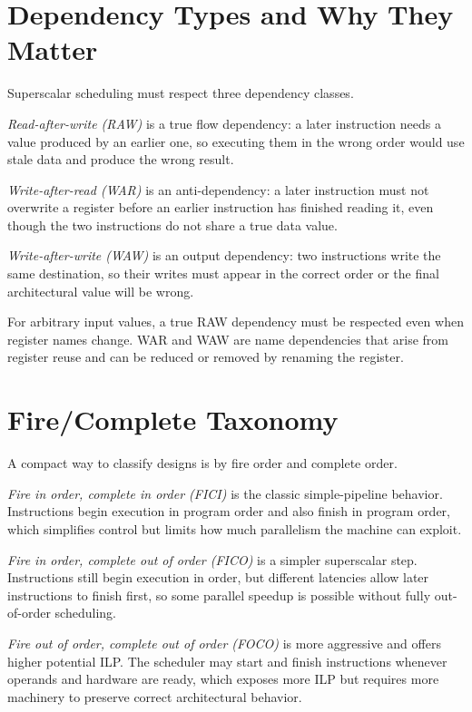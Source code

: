 \section{Dependency Types and Why They Matter}\label{sec:ilp-dependencies}
Superscalar scheduling must respect three dependency classes.

\textit{Read-after-write (RAW)} is a true flow dependency: a later instruction needs a value produced by an earlier one, so executing them in the wrong order would use stale data and produce the wrong result.

\textit{Write-after-read (WAR)} is an anti-dependency: a later instruction must not overwrite a register before an earlier instruction has finished reading it, even though the two instructions do not share a true data value.

\textit{Write-after-write (WAW)} is an output dependency: two instructions write the same destination, so their writes must appear in the correct order or the final architectural value will be wrong.

For arbitrary input values, a true RAW dependency must be respected even when register names change.
WAR and WAW are name dependencies that arise from register reuse and can be reduced or removed by renaming the register.


\section{Fire/Complete Taxonomy}\label{sec:ilp-fire-complete}
A compact way to classify designs is by fire order and complete order.

\textit{Fire in order, complete in order (FICI)} is the classic simple-pipeline behavior.
Instructions begin execution in program order and also finish in program order, which simplifies control but limits how much parallelism the machine can exploit.

\textit{Fire in order, complete out of order (FICO)} is a simpler superscalar step.
Instructions still begin execution in order, but different latencies allow later instructions to finish first, so some parallel speedup is possible without fully out-of-order scheduling.

\textit{Fire out of order, complete out of order (FOCO)} is more aggressive and offers higher potential ILP\@.
The scheduler may start and finish instructions whenever operands and hardware are ready, which exposes more ILP but requires more machinery to preserve correct architectural behavior.


